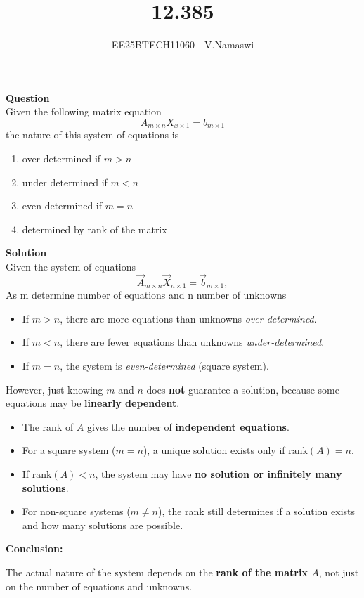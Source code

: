 \documentclass[journal]{IEEEtran}
\begin{document}

\vspace{3cm}

\title{12.385}
\author{EE25BTECH11060 - V.Namaswi}
{\let\newpage\relax\maketitle}
\renewcommand{\thefigure}{\theenumi}
\renewcommand{\thetable}{\theenumi}
\setlength{\intextsep}{10pt} %
\textbf{Question}\\
Given the following matrix equation 
 \[
A_{m \times n} X_{x \times 1} = b_{m \times 1}
\]  the nature of this system of equations is \\
\begin{multicols}{2}
    \begin{enumerate}
\item  over determined if $m>n$
 \item  under determined if $m<n$
 \item  even determined if $m=n$
 \item  determined by rank of the matrix 
    \end{enumerate}
\end{multicols}
\textbf{Solution}\\
Given the system of equations 
\[
\Vec{A}_{m \times n} \Vec{X}_{n \times 1} = \Vec{b}_{m \times 1},
\] 
As m determine number of equations and n number of unknowns\\ 
  
\begin{itemize}
    \item If $m > n$, there are more equations than unknowns   \textit{over-determined}.
    \item If $m < n$, there are fewer equations than unknowns   \textit{under-determined}.
    \item If $m = n$, the system is \textit{even-determined} (square system).
    \end{itemize}
However, just knowing $m$ and $n$ does \textbf{not} guarantee a solution, because some equations may be \textbf{linearly dependent}.

\begin{itemize}
    \item The rank of $A$ gives the number of \textbf{independent equations}.
    \item For a square system ($m=n$), a unique solution exists only if $\text{rank}(A) = n$.
    \item If $\text{rank}(A) < n$, the system may have \textbf{no solution or infinitely many solutions}.
    \item For non-square systems ($m \neq n$), the rank still determines if a solution exists and how many solutions are possible.
\end{itemize}

\textbf{Conclusion:}  

The actual nature of the system depends on the \textbf{rank of the matrix $A$}, not just on the number of equations and unknowns.  
\end{document}

